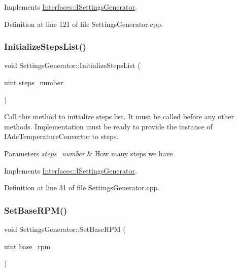 Implements \hyperlink{class_interfaces_1_1_i_settings_generator_a8de5944be5295009b7407772bc9b1b3b}{Interfaces\+::\+I\+Settings\+Generator}.



Definition at line 121 of file Settings\+Generator.\+cpp.

\mbox{\label{class_settings_generator_a84b81d11cb5f83d4066e73a03acfc143}} 
\subsubsection{\texorpdfstring{Initialize\+Steps\+List()}{InitializeStepsList()}}
{\footnotesize\ttfamily void Settings\+Generator\+::\+Initialize\+Steps\+List (\begin{DoxyParamCaption}\item[{uint}]{steps\+\_\+number }\end{DoxyParamCaption})\hspace{0.3cm}{\ttfamily [virtual]}}



Call this method to initialize steps list. It must be called before any other methods. Implementation must be ready to provide the instance of I\+Adc\+Temperature\+Convertor to steps. 


\begin{DoxyParams}{Parameters}
{\em steps\+\_\+number} & How many steps we have \\
\hline
\end{DoxyParams}


Implements \hyperlink{class_interfaces_1_1_i_settings_generator_a4aa0307e906c003012aad75101072c65}{Interfaces\+::\+I\+Settings\+Generator}.



Definition at line 31 of file Settings\+Generator.\+cpp.

\mbox{\label{class_settings_generator_a1c1960b9021f7081b4c42c4d7c0eda34}} 
\subsubsection{\texorpdfstring{Set\+Base\+R\+P\+M()}{SetBaseRPM()}}
{\footnotesize\ttfamily void Settings\+Generator\+::\+Set\+Base\+R\+PM (\begin{DoxyParamCaption}\item[{uint}]{base\+\_\+rpm }\end{DoxyParamCaption})\hspace{0.3cm}{\ttfamily [virtual]}}



